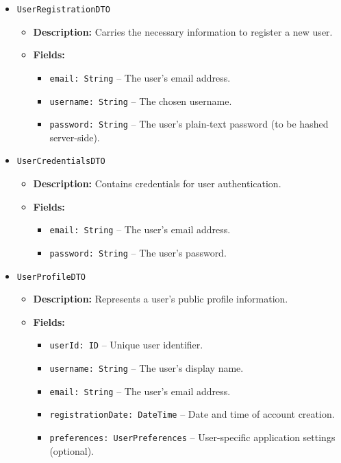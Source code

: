 \begin{itemize}
    \item \texttt{UserRegistrationDTO}
    \begin{itemize}
        \item \textbf{Description:} Carries the necessary information to register a new user.
        \item \textbf{Fields:}
        \begin{itemize}
            \item \texttt{email: String} – The user's email address.
            \item \texttt{username: String} – The chosen username.
            \item \texttt{password: String} – The user's plain-text password (to be hashed server-side).
        \end{itemize}
    \end{itemize}

    \item \texttt{UserCredentialsDTO}
    \begin{itemize}
        \item \textbf{Description:} Contains credentials for user authentication.
        \item \textbf{Fields:}
        \begin{itemize}
            \item \texttt{email: String} – The user's email address.
            \item \texttt{password: String} – The user's password.
        \end{itemize}
    \end{itemize}

    \item \texttt{UserProfileDTO}
    \begin{itemize}
        \item \textbf{Description:} Represents a user's public profile information.
        \item \textbf{Fields:}
        \begin{itemize}
            \item \texttt{userId: ID} – Unique user identifier.
            \item \texttt{username: String} – The user's display name.
            \item \texttt{email: String} – The user's email address.
            \item \texttt{registrationDate: DateTime} – Date and time of account creation.
            \item \texttt{preferences: UserPreferences} – User-specific application settings (optional).
        \end{itemize}
    \end{itemize}


\end{itemize}
